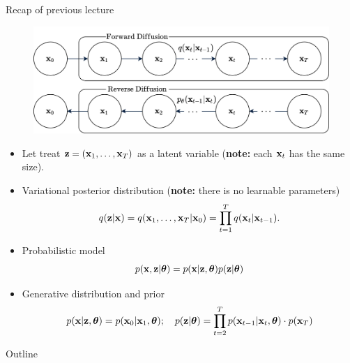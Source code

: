 \begin{frame}{Recap of previous lecture}
	\vspace{-0.2cm}
	\begin{figure}
		\includegraphics[width=0.65\linewidth]{figs/diffusion_pgm}
	\end{figure}
	\begin{itemize}
		\item Let treat $\mathbf{z} = (\mathbf{x}_1, \dots, \mathbf{x}_T)$ as a latent variable (\textbf{note:} each $\mathbf{x}_t$ has the same size).
		\item Variational posterior distribution (\textbf{note:} there is no learnable parameters)
		\vspace{-0.4cm}
		\[
			q(\mathbf{z} | \mathbf{x}) = q(\mathbf{x}_1, \dots, \mathbf{x}_T | \mathbf{x}_0) = \prod_{t = 1}^T q(\mathbf{x}_t | \mathbf{x}_{t - 1}).
		\]
		\vspace{-0.5cm}
		\item Probabilistic model
		\vspace{-0.2cm}
		\[
			p(\mathbf{x}, \mathbf{z} | \boldsymbol{\theta}) = p(\mathbf{x} | \mathbf{z}, \boldsymbol{\theta}) p(\mathbf{z} | \boldsymbol{\theta})
		\]
		\item Generative distribution and prior
		\vspace{-0.3cm}
		\[
			p(\mathbf{x} | \mathbf{z}, \boldsymbol{\theta}) = p(\mathbf{x}_0 | \mathbf{x}_1, \boldsymbol{\theta}); \quad 
			p(\mathbf{z} | \boldsymbol{\theta}) = \prod_{t=2}^T p(\mathbf{x}_{t - 1} | \mathbf{x}_t, \boldsymbol{\theta}) \cdot p(\mathbf{x}_T)
		\]
	\end{itemize}
\end{frame}
\begin{frame}{Outline}
	\tableofcontents
\end{frame}
